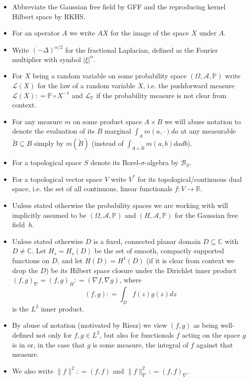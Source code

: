 \documentclass[11pt,reqno]{amsart}
\numberwithin{equation}{section}
\newcommand{\deq}{\mathrel{\mathop:}=}
\begin{document}
\begin{itemize}
	\item Abbreviate the Gaussian free field by GFF and the reproducing kernel Hilbert space by RKHS.
	\item For an operator $A$ we write $AX$ for the image of the space $X$ under $A$.
	\item Write $(-\Delta)^{\alpha/2}$ for the fractional Laplacian, defined as the Fourier multiplier with symbol $|\xi|^\alpha$.
	\item For $X$ being a random variable on some probability space $(\Omega, \mathcal A, \mathbb P)$ write $\mathcal L(X)$ for the law of a random variable $X$, i.e. the pushforward measure $\mathcal L(X)\deq \mathbb P\circ X^{-1}$ and $\mathcal L_\mathbb{P}$ if the probability measure is not clear from context.
	\item For any measure $m$ on some product space $A\times B$ we will abuse notation to denote the evaluation of its $B$ marginal $\int_A m(a,\cdot)da$ at any measurable $\tilde B\subseteq B$ simply by $m(\tilde B)$ (instead of $\int_{A\times\tilde B}m(a,b)dadb$).
	\item For a topological space $S$ denote its Borel-$\sigma$-algebra by $\mathcal B_S$.
	\item For a topological vector space $V$ write $V^*$ for its topological/continuous dual space, i.e. the set of all continuous, linear functionals $f:V\rightarrow\mathbb R$.
	\item Unless stated otherwise the probability spaces we are working with will implicitly assumed to be $(\Omega,\mathcal A,\mathbb P)$ and $(H,\mathcal A, \mathbb P)$ for the Gaussian free field~$h$.
	\item Unless stated otherwise $D$ is a fixed, connected planar domain $D\subseteq\mathbb C$ with $D\neq\mathbb C$. Let $H_s=H_s(D)$ be the set of smooth, compactly supported functions on $D$, and let $H(D)=H^1(D)$ (if it is clear from context we drop the $D$) be its Hilbert space closure under the Dirichlet inner product $(f,g)_\nabla=(f,g)_H\deq (\nabla f,\nabla g)$, where $$(f,g)\deq\int_D f(z)g(z)dz$$ is the $L^2$ inner product.
	\item By abuse of notation (motivated by Riesz) we view $(f,g)$ as being well-defined not only for $f,g\in L^2$, but also for functionals $f$ acting on the space $g$ is in or, in the case that $g$ is some measure, the integral of $f$ against that measure.
	\item We also write $\|f\|^2\deq (f,f)$ and $\|f\|^2_\nabla\deq (f,f)_\nabla$.

\end{itemize}
\end{document}
